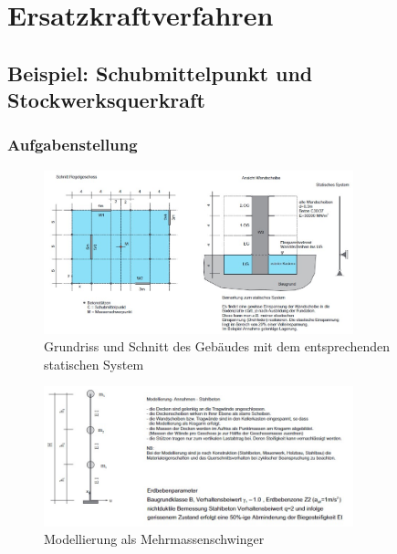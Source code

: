 \documentclass[
  letterpaper,
  DIV=11]{scrreprt}
\begin{document}
\part{Ersatzkraftverfahren}

\hypertarget{beispiel-schubmittelpunkt-und-stockwerksquerkraft}{%
\chapter{Beispiel: Schubmittelpunkt und
Stockwerksquerkraft}\label{beispiel-schubmittelpunkt-und-stockwerksquerkraft}}

\hypertarget{aufgabenstellung-15}{%
\section{Aufgabenstellung}\label{aufgabenstellung-15}}

\begin{figure}[H]

{\centering \includegraphics[width=0.8\textwidth,height=\textheight]{bilder/ekv1.jpg}

}

\caption{\label{fig-ekv_system}Grundriss und Schnitt des Gebäudes mit
dem entsprechenden statischen System}

\end{figure}

\begin{figure}[H]

{\centering \includegraphics[width=0.8\textwidth,height=\textheight]{bilder/ekv2.jpg}

}

\caption{Modellierung als Mehrmassenschwinger}

\end{figure}
\end{document}

